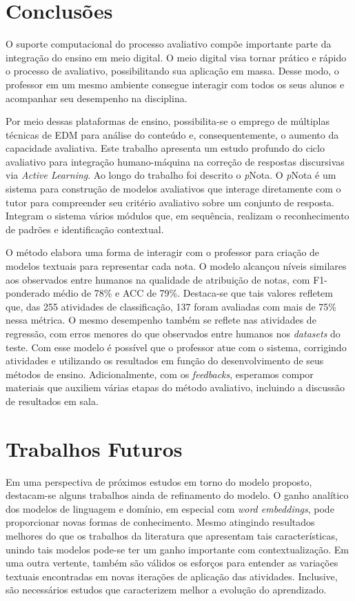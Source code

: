 \newpage

\section{Conclusões}

O suporte computacional do processo avaliativo compõe importante parte da integração do ensino em meio digital. O meio digital visa tornar prático e rápido o processo de avaliativo, possibilitando sua aplicação em massa. Desse modo, o professor em um mesmo ambiente consegue interagir com todos os seus alunos e acompanhar seu desempenho na disciplina. 

Por meio dessas plataformas de ensino, possibilita-se o emprego de múltiplas técnicas de EDM para análise do conteúdo e, consequentemente, o aumento da capacidade avaliativa. Este trabalho apresenta um estudo profundo do ciclo avaliativo para integração humano-máquina na correção de respostas discursivas via \textit{Active Learning}. Ao longo do trabalho foi descrito o \textit{p}Nota. O \textit{p}Nota é um sistema para construção de modelos avaliativos que interage diretamente com o tutor para compreender seu critério avaliativo sobre um conjunto de resposta. Integram o sistema vários módulos que, em sequência, realizam o reconhecimento de padrões e identificação contextual.

O método elabora uma forma de interagir com o professor para criação de modelos textuais para representar cada nota. O modelo alcançou níveis similares aos observados entre humanos na qualidade de atribuição de notas, com F1-ponderado médio de 78\% e ACC de 79\%. Destaca-se que tais valores refletem que, das 255 atividades de classificação, 137 foram avaliadas com mais de 75\% nessa métrica. O mesmo desempenho também se reflete nas atividades de regressão, com erros menores do que observados entre humanos nos \textit{datasets} do teste. Com esse modelo é possível que o professor atue com o sistema, corrigindo atividades e utilizando os resultados em função do desenvolvimento de seus métodos de ensino. Adicionalmente, com os \textit{feedbacks}, esperamos compor materiais que auxiliem várias etapas do método avaliativo, incluindo a discussão de resultados em sala.

\section{Trabalhos Futuros}

Em uma perspectiva de próximos estudos em torno do modelo proposto, destacam-se alguns trabalhos ainda de refinamento do modelo. O ganho analítico dos modelos de linguagem e domínio, em especial com \textit{word embeddings}, pode proporcionar novas formas de conhecimento. Mesmo atingindo resultados melhores do que os trabalhos da literatura que apresentam tais características, unindo tais modelos pode-se ter um ganho importante com contextualização. Em uma outra vertente, também são válidos os esforços para entender as variações textuais encontradas em novas iterações de aplicação das atividades. Inclusive, são necessários estudos que caracterizem melhor a evolução do aprendizado.

